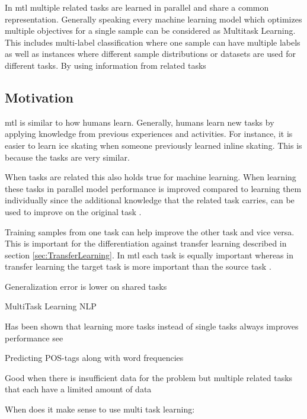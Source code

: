 In \gls{mtl} multiple related tasks are learned in parallel and share a common representation. Generally speaking every machine learning model which optimizes multiple objectives for a single sample can be considered as Multitask Learning. This includes multi-label classification where one sample can have multiple labels as well as instances where different sample distributions or datasets are used for different tasks. 
By using information from related tasks




\subsection{Motivation}

\gls{mtl} is similar to how humans learn. Generally, humans learn new tasks by applying knowledge from previous experiences and activities. For instance, it is easier to learn ice skating when someone previously learned inline skating. This is because the tasks are very similar.

When tasks are related this also holds true for machine learning. When learning these tasks in parallel model performance is improved compared to learning them individually since the additional knowledge that the related task carries, can be used to improve on the original task \cite{Caruana1997a}. 

Training samples from one task can help improve the other task and vice versa. This is important for the differentiation against transfer learning \cite{Pratt1993} described in section \ref{sec:TransferLearning}. In \gls{mtl} each task is equally important whereas in transfer learning the target task is more important than the source task \cite{Zhang2017a}.






Generalization error is lower on shared tasks \cite{Caruana1993}

MultiTask Learning NLP \cite{Søgaard2016}

Has been shown that learning more tasks instead of single tasks always improves performance see \cite{Ramsundar2015}

Predicting POS-tags along with word frequencies \cite{Plank}

Good when there is insufficient data for the problem but multiple related tasks that each have a limited amount of data \cite{Zhang2017a} 

When does it make sense to use multi task learning:

